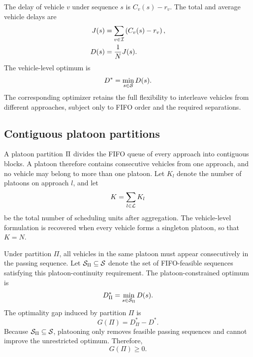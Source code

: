 The delay of vehicle \(v\) under sequence \(s\) is \(C_v(s)-r_v\). The total and average vehicle delays are
\begin{align}
J(s)&=\sum_{v\in\mathcal{I}}\left(C_v(s)-r_v\right),
\label{eq:total-delay}\\
D(s)&=\frac{1}{N}J(s).
\label{eq:average-delay}
\end{align}
The vehicle-level optimum is
\begin{equation}
D^*=\min_{s\in\mathcal{S}}D(s).
\label{eq:vehicle-level-optimum}
\end{equation}
The corresponding optimizer retains the full flexibility to interleave vehicles from different approaches, subject only to FIFO order and the required separations.

\subsection{Contiguous platoon partitions}

A platoon partition \(\Pi\) divides the FIFO queue of every approach into contiguous blocks. A platoon therefore contains consecutive vehicles from one approach, and no vehicle may belong to more than one platoon. Let \(K_l\) denote the number of platoons on approach \(l\), and let
\begin{equation}
K=\sum_{l\in\mathcal{L}}K_l
\label{eq:total-platoons}
\end{equation}
be the total number of scheduling units after aggregation. The vehicle-level formulation is recovered when every vehicle forms a singleton platoon, so that \(K=N\).

Under partition \(\Pi\), all vehicles in the same platoon must appear consecutively in the passing sequence. Let \(\mathcal{S}_{\Pi}\subseteq\mathcal{S}\) denote the set of FIFO-feasible sequences satisfying this platoon-continuity requirement. The platoon-constrained optimum is
\begin{equation}
D^*_{\Pi}=\min_{s\in\mathcal{S}_{\Pi}}D(s).
\label{eq:platoon-optimum}
\end{equation}
The optimality gap induced by partition \(\Pi\) is
\begin{equation}
G(\Pi)=D^*_{\Pi}-D^*.
\label{eq:optimality-gap}
\end{equation}
Because \(\mathcal{S}_{\Pi}\subseteq\mathcal{S}\), platooning only removes feasible passing sequences and cannot improve the unrestricted optimum. Therefore,
\begin{equation}
G(\Pi)\ge 0.
\label{eq:nonnegative-gap}
\end{equation}

